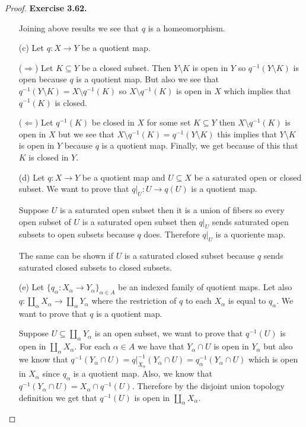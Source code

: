 \documentclass[11pt]{article}
\newcommand{\setmin}{\setminus}
\theoremstyle{definition}
\begin{document}
\begin{proof}{\textbf{Exercise 3.62.}}
\begin{itemize}
    Joining above results we see that $q$ is a homeomorphism.

    \item [(c)]
    Let $q: X \to Y$ be a quotient map.

    ($\Rightarrow$) Let $K \subseteq Y$ be a closed subset.
    Then $Y \setmin K$ is open in $Y$ so $q^{-1}(Y \setmin K)$ is open because
    $q$ is a quotient map.
    But also we see that $q^{-1}(Y \setmin K) = X \setmin q^{-1}(K)$ so
    $X \setmin q^{-1}(K)$ is open in $X$ which implies that $q^{-1}(K)$ is
    closed.

    ($\Leftarrow$) Let $q^{-1}(K)$ be closed in $X$ for some set
    $K \subseteq Y$ then $X \setmin q^{-1}(K)$ is open in $X$ but we see that
    $X \setmin q^{-1}(K) = q^{-1}(Y \setmin K)$ this implies that $Y \setmin K$
    is open in $Y$ because $q$ is a quotient map. Finally, we get because
    of this that $K$ is closed in $Y$.

    \item [(d)] Let $q: X\to Y$ be a quotient map and $U \subseteq X$ be a
    saturated open or closed subset. We want to prove that $q|_U:U \to q(U)$
    is a quotient map.

    Suppose $U$ is a saturated open subset then it is a union of fibers
    so every open subset of $U$ is a saturated open subset then
    $q|_U$ sends saturated open subsets to open subsets because $q$ does.
    Therefore $q|_U$ is a quoriente map.
    
    The same can be shown if $U$ is a saturated closed subset because $q$
    sends saturated closed subsets to closed subsets.

    \item [(e)] Let $\{q_\alpha:X_\alpha \to Y_\alpha\}_{\alpha \in A}$
    be an indexed family of quotient maps.
    Let also $q:\coprod_\alpha X_\alpha \to \coprod_\alpha Y_\alpha$
    where the restriction of $q$ to each $X_\alpha$ is equal to $q_\alpha$.
    We want to prove that $q$ is a quotient map.
    
    Suppose $U \subseteq \coprod_\alpha Y_\alpha$ is an open subset,
    we want to prove that $q^{-1}(U)$ is open in $\coprod_\alpha X_\alpha$.
    For each $\alpha\in A$ we have that $Y_\alpha \cap U$ is open in $Y_\alpha$
    but also we know that $q^{-1}(Y_\alpha \cap U) =
    q|_{X_\alpha}^{-1}(Y_\alpha \cap U) = q_\alpha^{-1}(Y_\alpha \cap U)$ 
    which is open in $X_\alpha$ since $q_\alpha$ is a quotient map.
    Also, we know that $q^{-1}(Y_\alpha \cap U) = X_\alpha \cap q^{-1}(U)$.
    Therefore by the disjoint union topology definition we get that
    $q^{-1}(U)$ is open in $\coprod_\alpha X_\alpha$.


\end{itemize}
\end{proof}
\end{document}
